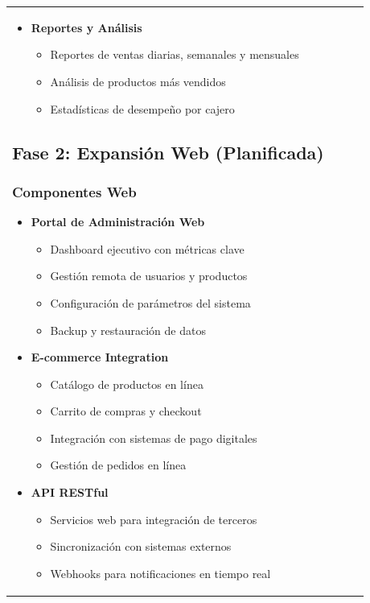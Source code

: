 \documentclass[12pt,letterpaper]{article}
\begin{document}
\begin{longtable}{|p{3cm}|p{2cm}|p{4cm}|p{6cm}|}
\begin{itemize}
    \item \textbf{Reportes y Análisis}
    \begin{itemize}
        \item Reportes de ventas diarias, semanales y mensuales
        \item Análisis de productos más vendidos
        \item Estadísticas de desempeño por cajero
    \end{itemize}
\end{itemize}

\subsection{Fase 2: Expansión Web (Planificada)}

\subsubsection{Componentes Web}
\begin{itemize}
    \item \textbf{Portal de Administración Web}
    \begin{itemize}
        \item Dashboard ejecutivo con métricas clave
        \item Gestión remota de usuarios y productos
        \item Configuración de parámetros del sistema
        \item Backup y restauración de datos
    \end{itemize}
    
    \item \textbf{E-commerce Integration}
    \begin{itemize}
        \item Catálogo de productos en línea
        \item Carrito de compras y checkout
        \item Integración con sistemas de pago digitales
        \item Gestión de pedidos en línea
    \end{itemize}
    
    \item \textbf{API RESTful}
    \begin{itemize}
        \item Servicios web para integración de terceros
        \item Sincronización con sistemas externos
        \item Webhooks para notificaciones en tiempo real
    \end{itemize}
\end{itemize}


\end{longtable}
\end{document}
